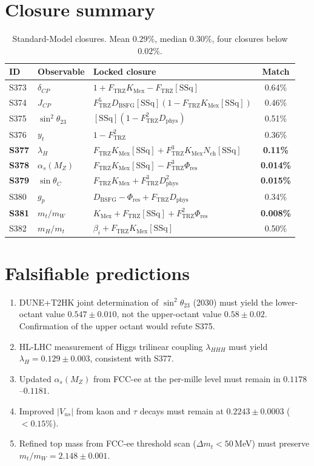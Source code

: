 \documentclass[11pt]{article}
\newcommand{\Ftrz}{F_{\mathrm{TRZ}}}
\newcommand{\Phires}{\Phi_{\mathrm{res}}}
\newcommand{\KMex}{K_{\mathrm{Mex}}}
\newcommand{\Dphys}{D_{\mathrm{phys}}}
\newcommand{\Dbsfg}{D_{\mathrm{BSFG}}}
\newcommand{\Nch}{N_{\mathrm{ch}}}
\newcommand{\bii}{\beta_i}
\newcommand{\SSq}{[\mathrm{SSq}]}
\begin{document}
\section{Closure summary}
\begin{table}[h!]
\centering
\begin{tabular}{lllc}
\toprule
ID & Observable & Locked closure & Match \\
\midrule
S373 & $\delta_{CP}$           & $1+\Ftrz\KMex-\Ftrz\SSq$                              & 0.64\% \\
S374 & $J_{CP}$                & $\Ftrz^{5}\Dbsfg\SSq(1-\Ftrz\KMex\SSq)$               & 0.46\% \\
S375 & $\sin^{2}\theta_{23}$   & $\SSq(1-\Ftrz^{2}\Dphys)$                             & 0.51\% \\
S376 & $y_t$                   & $1-\Ftrz^{2}$                                         & 0.36\% \\
\textbf{S377} & $\lambda_H$    & $\Ftrz\KMex\SSq+\Ftrz^{3}\KMex\Nch\SSq$               & \textbf{0.11\%} \\
\textbf{S378} & $\alpha_s(M_Z)$& $\Ftrz\KMex\SSq-\Ftrz^{3}\Phires$                     & \textbf{0.014\%} \\
\textbf{S379} & $\sin\theta_C$ & $\Ftrz\KMex+\Ftrz^{3}\Dphys^{2}$                      & \textbf{0.015\%} \\
S380 & $g_p$                   & $\Dbsfg-\Phires+\Ftrz\Dphys$                          & 0.34\% \\
\textbf{S381} & $m_t/m_W$      & $\KMex+\Ftrz\SSq+\Ftrz^{2}\Phires$                    & \textbf{0.008\%} \\
S382 & $m_H/m_t$               & $\bii+\Ftrz\KMex\SSq$                                 & 0.50\% \\
\bottomrule
\end{tabular}
\caption{Standard-Model closures.  Mean $0.29\%$, median $0.30\%$,
four closures below $0.02\%$.}
\end{table}

\section{Falsifiable predictions}
\begin{enumerate}[label=(F\arabic*)]
\item DUNE+T2HK joint determination of $\sin^{2}\theta_{23}$ (2030) must yield the lower-octant value $0.547\pm 0.010$, not the upper-octant value $0.58\pm 0.02$.  Confirmation of the upper octant would refute S375.
\item HL-LHC measurement of Higgs trilinear coupling $\lambda_{HHH}$ must yield $\lambda_H=0.129\pm 0.003$, consistent with S377.
\item Updated $\alpha_s(M_Z)$ from FCC-ee at the per-mille level must remain in $0.1178$--$0.1181$.
\item Improved $|V_{us}|$ from kaon and $\tau$ decays must remain at $0.2243\pm 0.0003$ ($<0.15\%$).
\item Refined top mass from FCC-ee threshold scan ($\Delta m_t<50$\,MeV) must preserve $m_t/m_W=2.148\pm 0.001$.
\end{enumerate}
\end{document}
